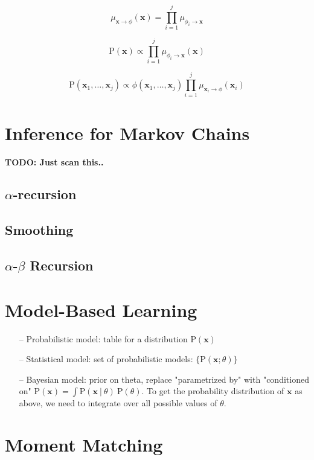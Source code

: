 \documentclass{article}
\newcommand{\prob}{\text{P}}
\renewcommand{\vec}[1]{\mathbf{#1}}
\newcommand{\bx}{\vec{x}}
\newcommand{\giv}{\ |\ }
\begin{document}
\begin{equation*}
    \mu_{\bx \to \phi}(\bx) = \prod_{i = 1} ^ {j} \mu_{\phi_i \to \bx}
\end{equation*}

\begin{equation*}
    \prob(\bx) \propto \prod_{i = 1}^j \mu_{\phi_i \to \bx}(\bx)
\end{equation*}

\begin{equation*}
    \prob(\bx_1, \dots, \bx_j) \propto \phi(\bx_1, \dots, \bx_j)
        \prod_{i = 1}^{j} \mu_{\bx_i \to \phi} (\bx_i)
\end{equation*}

\section{Inference for Markov Chains}
\textbf{TODO: Just scan this..}
\subsection{$\alpha$-recursion}
\subsection{Smoothing}
\subsection{$\alpha$-$\beta$ Recursion}

\section{Model-Based Learning}
\begin{itemize}
    \item[--] Probabilistic model: table for a distribution $\prob(\bx)$
    \item[--] Statistical model: set of probabilistic models: $\{ \prob(\bx; \theta) \}$
    \item[--] Bayesian model: prior on theta, replace "parametrized by" with "conditioned on"
        $\prob(\bx) = \int \prob(\bx \giv \theta)\ \prob(\theta)$. To get the probability distribution
        of $\bx$ as above, we need to integrate over all possible values of $\theta$.
\end{itemize}

\section{Moment Matching}
\end{document}
